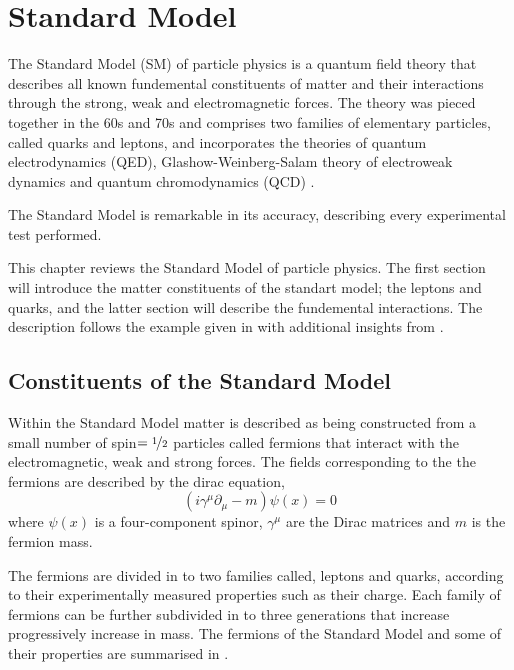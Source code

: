 \chapter{Standard Model}
\label{chap:sm}
The Standard Model (SM) of particle physics is a quantum field theory that
describes all known fundemental constituents of matter and their interactions
through the strong, weak and electromagnetic forces.  The theory was pieced
together in the 60s and 70s and comprises two families of elementary particles,
called quarks and leptons, and incorporates the theories of quantum
electrodynamics (QED), Glashow-Weinberg-Salam theory of electroweak dynamics and
quantum chromodynamics (QCD) \cite{t1972regularization, glashow1961partial,
weinberg1967model, salam1968weak}.

The Standard Model is remarkable in its accuracy, describing every experimental
test performed.  

This chapter reviews the Standard Model of particle physics. The first section will 
introduce the matter constituents of the standart model; the leptons and quarks,
and the latter section will describe the fundemental interactions. 
The description follows the example given in \cite{ral} with additional insights
from \cite{perkins2000introduction,griffiths2008introduction,halzen1984quarks}.

\section{Constituents of the Standard Model}
\label{sec:matter}
Within the Standard Model matter is described as being constructed from a small
number of spin$=\nicefrac{1}{2}$ particles called fermions that interact with
the electromagnetic, weak and strong forces. 
The fields corresponding to the the fermions are described by the dirac
equation,
\begin{equation}
\left( i \gamma^{\mu} \partial_{\mu} - m \right) \psi(x) = 0
\end{equation}
where $\psi(x)$ is a four-component spinor, $\gamma^{\mu}$ are the Dirac
matrices and $m$ is the fermion mass.

The fermions are divided in to two families called, leptons and quarks,
according to their experimentally measured properties such as their charge.
Each family of fermions can be further subdivided in to three generations that
increase progressively increase in mass. The fermions of the Standard Model and
some of their properties are summarised in .

